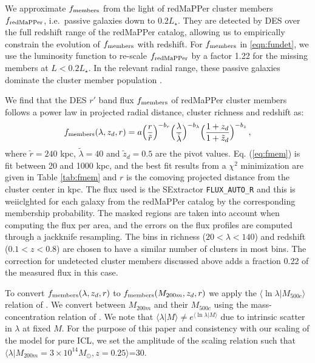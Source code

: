 {We approximate $f_{\rm members}$ from the light of redMaPPer cluster members $f_{\rm redMaPPer}$, i.e.~passive galaxies down to $0.2 L_\star$. They are detected by DES over the full redshift range of the redMaPPer catalog, allowing us to empirically constrain the evolution of $f_{\rm members}$ with redshift. For $f_{\rm members}$ in \ref{eqn:fundet}, we use the luminosity function to re-scale $f_{\rm redMaPPer}$ by a factor 1.22 for the missing members at $L<0.2 L_\star$. In the relevant radial range, these passive galaxies dominate the cluster member population \citep[e.g.]{zu2}. 

We find that the DES $r'$ band flux $f_{\rm members}$ of redMaPPer cluster members follows a power law in projected radial distance, cluster richness and redshift as:
\begin{equation}
f_{\rm members}(\lambda, z_{d}, r) = a \Big(\frac{r}{\tilde{r}} \Big)^{-b_r} \Big(\frac{\lambda}{\tilde{\lambda}}\Big)^{-b_\lambda} \Big(\frac{1+z_d}{1+\tilde{z}_d}\Big)^{-b_z} \,,\label{eq:fmem}
\end{equation}
where $\tilde{r}=240$ kpc, $\tilde{\lambda}=40$ and $\tilde{z}_d=0.5$ are the pivot values.
Eq. (\ref{eq:fmem}) is fit between 20 and 1000 kpc, and the best fit results from a $\chi^2$ minimization are given in Table \ref{tab:fmem} and $r$ is the comoving projected distance from the cluster center in kpc. The flux used is the SExtractor \texttt{FLUX\_AUTO\_R} and this is wei{icl}ghted for each galaxy from the redMaPPer catalog by the corresponding membership probability. The masked regions are taken into account when computing the flux per area, and the errors on the flux profiles are computed through a jackknife resampling. The bins in richness ($20<\lambda<140$) and redshift ($0.1<z<0.8$) are chosen to have a similar number of clusters in most bins. The correction for undetected cluster members discussed above adds a fraction 0.22 of the measured flux in this case.

To convert $f_{\rm members}(\lambda, z_{d}, r)$ to $f_{\rm members}(M_{200m}, z_{d}, r)$ we apply the $\langle\ln\lambda|M_{500c}\rangle$ relation of \citet{2015MNRAS.454.2305S}. We convert between $M_{200m}$ and their $M_{500c}$ using the mass-concentration relation of \citet{2008MNRAS.390L..64D}. We note that $\langle\lambda|M\rangle\neq e^{\langle\ln\lambda|M\rangle}$ due to intrinsic scatter in $\lambda$ at fixed $M$. For the purpose of this paper and consistency with our scaling of the \citet{icl} model for pure ICL, we set the amplitude of the scaling relation such that $\langle\lambda|M_{200m}=3\times10^{14}M_{\odot},z=0.25\rangle$=30.

}
